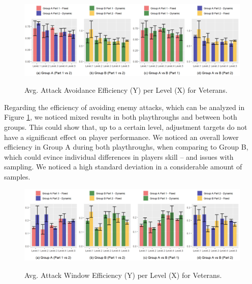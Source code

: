 \begin{figure}[!ht]
    \begin{center}
        \caption{Avg. Attack Avoidance Efficiency (Y) per Level (X) for Veterans.}
        \includegraphics[width=\textwidth]{figures/attack_avoidance_efficiency-veteran_players.png}
    \label{fig:result-metric-veterans-attack-avoidance-efficiency}
    \end{center}
\end{figure}

Regarding the efficiency of avoiding enemy attacks, which can be analyzed in Figure \ref{fig:result-metric-veterans-attack-avoidance-efficiency}, we noticed mixed results in both playthroughs and between both groups. This could show that, up to a certain level, adjustment targets do not have a significant effect on player performance. We noticed an overall lower efficiency in Group A during both playthroughs, when comparing to Group B, which could evince individual differences in players skill -- and issues with sampling. We noticed a high standard deviation in a considerable amount of samples.

\begin{figure}[!ht]
    \begin{center}
    \caption{Avg. Attack Window Efficiency (Y) per Level (X) for Veterans.}
        \includegraphics[width=\textwidth]{figures/attack_window_efficiency-veteran_players.png}
    \label{fig:result-metric-veterans-attack-window-efficiency}
    \end{center}
\end{figure}


